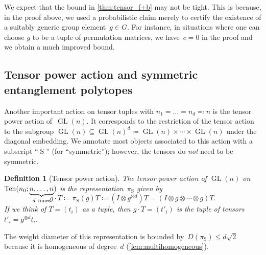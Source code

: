 \documentclass[11pt,letterpaper]{article}
\newtheorem{definition}[theorem]{Definition}\AddToHook{env/definition/begin}{\crefalias{theorem}{definition}}
\numberwithin{equation}{section}
\newcommand{\ot}{\otimes}
\DeclareMathOperator{\GL}{GL}
\DeclareMathOperator{\Sym}{S}
\DeclareMathOperator{\Ten}{Ten}
\begin{document}
We expect that the bound in \cref{thm:tensor_f+b} may not be tight.
This is because, in the proof above, we used a probabilistic claim merely to certify the existence of a suitably generic group element~$g \in G$.
For instance, in situations where one can choose $g$ to be a tuple of permutation matrices, we have~$c = 0$ in the proof and we obtain a much improved bound.

\subsection{Tensor power action and symmetric entanglement polytopes}\label{sub:tensor_power_action}
Another important action on tensor tuples with $n_1=\dots=n_d\eqqcolon n$ is the tensor power action of~$\GL(n)$.
It corresponds to the restriction of the tensor action to the subgroup $\GL(n) \subseteq \GL(n)^d \coloneqq \GL(n) \times \cdots \times \GL(n)$ under the diagonal embedding.
We annotate most objects associated to this action with a subscript ``$\Sym$'' (for ``symmetric''); however, the tensors do \emph{not} need to be symmetric.

\begin{definition}[Tensor power action]
The \emph{tensor power action} of $\GL(n)$ on $\Ten(n_0;\smash{\underbrace{n,\ldots,n}_{d \text{ times}}})$ is the representation~$\pi_{\Sym}$ given by
\begin{equation}\label{eq:tenpow}
    g \cdot T \coloneqq \pi_{\Sym}(g)T \coloneqq (I \ot g^{\ot d}) T = (I\otimes g\otimes\cdots\otimes g)T.
\end{equation}
If we think of $T=(t_i)$ as a tuple, then $g\cdot T=(t'_i)$ is the tuple of tensors $t'_i = g^{\ot d} t_i$.
\end{definition}

The weight diameter of this representation is bounded by~$D(\pi_{\Sym}) \leq d\sqrt{2}$ because it is homogeneous of degree~$d$ (\cref{lem:multihomogeneous}).
\end{document}
